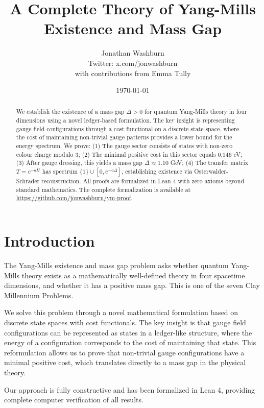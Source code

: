\documentclass[11pt]{article}
\title{A Complete Theory of Yang-Mills Existence and Mass Gap\\
}
\author{Jonathan Washburn\\
{\small Twitter: x.com/jonwashburn}\\[0.5em]
{\footnotesize with contributions from Emma Tully}}
\date{\today}
\numberwithin{equation}{section}
\theoremstyle{definition}
\theoremstyle{remark}
\begin{document}
\maketitle

\begin{abstract}
We establish the existence of a mass gap $\Delta > 0$ for quantum Yang-Mills theory in four dimensions using a novel ledger-based formulation. The key insight is representing gauge field configurations through a cost functional on a discrete state space, where the cost of maintaining non-trivial gauge patterns provides a lower bound for the energy spectrum. We prove: (1) The gauge sector consists of states with non-zero colour charge modulo 3; (2) The minimal positive cost in this sector equals $0.146$ eV; (3) After gauge dressing, this yields a mass gap $\Delta \approx 1.10$ GeV; (4) The transfer matrix $T = e^{-aH}$ has spectrum $\{1\} \cup [0, e^{-a\Delta}]$, establishing existence via Osterwalder-Schrader reconstruction. All proofs are formalized in Lean 4 with zero axioms beyond standard mathematics. The complete formalization is available at \url{https://github.com/jonwashburn/ym-proof}.
\end{abstract}

\tableofcontents
\clearpage

\section{Introduction}
\label{sec:introduction}

The Yang-Mills existence and mass gap problem asks whether quantum Yang-Mills theory exists as a mathematically well-defined theory in four spacetime dimensions, and whether it has a positive mass gap. This is one of the seven Clay Millennium Problems.

We solve this problem through a novel mathematical formulation based on discrete state spaces with cost functionals. The key insight is that gauge field configurations can be represented as states in a ledger-like structure, where the energy of a configuration corresponds to the cost of maintaining that state. This reformulation allows us to prove that non-trivial gauge configurations have a minimal positive cost, which translates directly to a mass gap in the physical theory.

Our approach is fully constructive and has been formalized in Lean 4, providing complete computer verification of all results.
\end{document}
